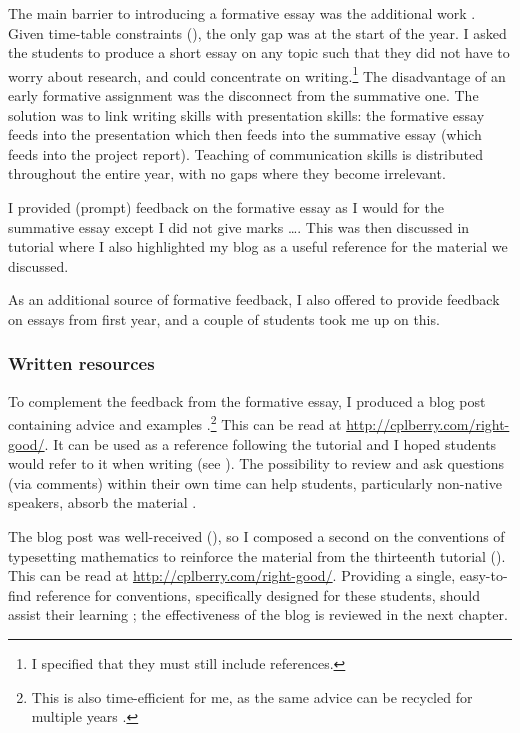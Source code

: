 The main barrier to introducing a formative essay was the additional work \citep[chapter 4]{Irons2008}. Given time-table constraints (), the only gap was at the start of the year. I asked the students to produce a short essay on any topic such that they did not have to worry about research, and could concentrate on writing.\footnote{I specified that they must still include references.} The disadvantage of an early formative assignment was the disconnect from the summative one. The solution was to link writing skills with presentation skills: the formative essay feeds into the presentation which then feeds into the summative essay (which feeds into the project report). Teaching of communication skills is distributed throughout the entire year, with no gaps where they become irrelevant.

I provided (prompt) feedback on the formative essay as I would for the summative essay except I did not give marks \ldots. This was then discussed in tutorial where I also highlighted my blog as a useful reference for the material we discussed.

As an additional source of formative feedback, I also offered to provide feedback on essays from first year, and a couple of students took me up on this.

\subsubsection{Written resources}\label{sec:blog}

To complement the feedback from the formative essay, I produced a blog post containing advice and examples \citep[chapter 4]{Irons2008}.\footnote{This is also time-efficient for me, as the same advice can be recycled for multiple years \citep[chapter 4]{Irons2008}.} This can be read at \url{http://cplberry.com/right-good/}. It can be used as a reference following the tutorial and I hoped students would refer to it when writing (see ). The possibility to review and ask questions (via comments) within their own time can help students, particularly non-native speakers, absorb the material \citep{Rainsbury2003}.

The blog post was well-received (), so I composed a second on the conventions of typesetting mathematics to reinforce the material from the thirteenth tutorial (). This can be read at \url{http://cplberry.com/right-good/}. Providing a single, easy-to-find reference for conventions, specifically designed for these students, should assist their learning \citep[cf.][chapter 9]{Ramsden1992}; the effectiveness of the blog is reviewed in the next chapter.

